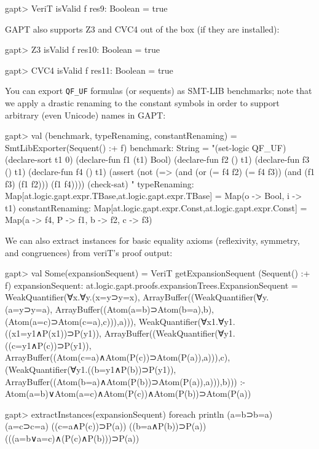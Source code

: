 \documentclass[a4paper,11pt]{article}
\begin{document}
\begin{clilisting}
gapt> VeriT isValid f
res9: Boolean = true

\end{clilisting}

GAPT also supports Z3 and CVC4 out of the box (if they are installed):
\begin{clilisting}
gapt> Z3 isValid f
res10: Boolean = true

gapt> CVC4 isValid f
res11: Boolean = true

\end{clilisting}

You can export \verb,QF_UF, formulas (or sequents) as SMT-LIB benchmarks;
note that we apply a drastic renaming to the constant symbols in order to
support arbitrary (even Unicode) names in GAPT:
\begin{clilisting}
gapt> val (benchmark, typeRenaming, constantRenaming) = SmtLibExporter(Sequent() :+ f)
benchmark: String =
"(set-logic QF_UF)
(declare-sort t1 0)
(declare-fun f1 (t1) Bool)
(declare-fun f2 () t1)
(declare-fun f3 () t1)
(declare-fun f4 () t1)
(assert (not (=> (and (or (= f4 f2) (= f4 f3)) (and (f1 f3) (f1 f2))) (f1 f4))))
(check-sat)
"
typeRenaming: Map[at.logic.gapt.expr.TBase,at.logic.gapt.expr.TBase] = Map(o -> Bool, i -> t1)
constantRenaming: Map[at.logic.gapt.expr.Const,at.logic.gapt.expr.Const] = Map(a -> f4, P -> f1, b -> f2, c -> f3)

\end{clilisting}

We can also extract instances for basic equality axioms (reflexivity, symmetry,
and congruences) from veriT's proof output:
\begin{clilisting}
gapt> val Some(expansionSequent) = VeriT getExpansionSequent (Sequent() :+ f)
expansionSequent: at.logic.gapt.proofs.expansionTrees.ExpansionSequent = WeakQuantifier(∀x.∀y.(x=y⊃y=x), ArrayBuffer((WeakQuantifier(∀y.(a=y⊃y=a), ArrayBuffer((Atom(a=b)⊃Atom(b=a),b), (Atom(a=c)⊃Atom(c=a),c))),a))), WeakQuantifier(∀x1.∀y1.((x1=y1∧P(x1))⊃P(y1)), ArrayBuffer((WeakQuantifier(∀y1.((c=y1∧P(c))⊃P(y1)), ArrayBuffer((Atom(c=a)∧Atom(P(c))⊃Atom(P(a)),a))),c), (WeakQuantifier(∀y1.((b=y1∧P(b))⊃P(y1)), ArrayBuffer((Atom(b=a)∧Atom(P(b))⊃Atom(P(a)),a))),b))) :- Atom(a=b)∨Atom(a=c)∧Atom(P(c))∧Atom(P(b))⊃Atom(P(a))

gapt> extractInstances(expansionSequent) foreach println
(a=b⊃b=a)
(a=c⊃c=a)
((c=a∧P(c))⊃P(a))
((b=a∧P(b))⊃P(a))
(((a=b∨a=c)∧(P(c)∧P(b)))⊃P(a))

\end{clilisting}
\end{document}
